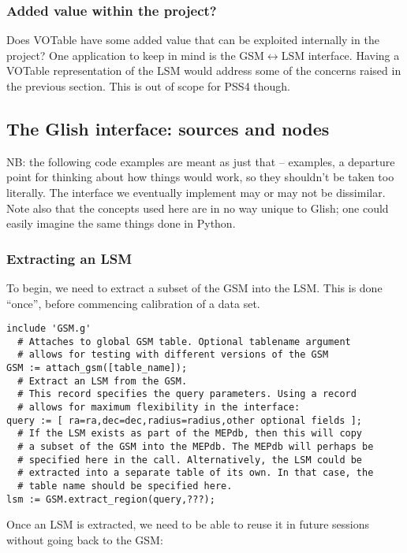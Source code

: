 \documentclass[10pt]{article}
\begin{document}
\subsubsection{Added value within the project?}

Does VOTable have some added value that can be exploited internally in the
project? One application to keep in mind is the GSM$\leftrightarrow$LSM
interface. Having a VOTable representation of the LSM would address some of the
concerns raised in the previous section. This is out of scope for PSS4 though.

\subsection{The Glish interface: sources and nodes}

NB: the following code examples are meant as just that -- examples, a departure
point for thinking about how things would work, so they shouldn't be taken too
literally. The interface we eventually implement may or may not be dissimilar.
Note also that the concepts used here are in no way unique to Glish; one could
easily imagine the same things done in Python. 

\subsubsection{Extracting an LSM}

To begin, we need to extract a subset of the GSM into the LSM. This is done
``once'', before commencing calibration of a data set.

\begin{verbatim}
include 'GSM.g'
  # Attaches to global GSM table. Optional tablename argument 
  # allows for testing with different versions of the GSM
GSM := attach_gsm([table_name]);   
  # Extract an LSM from the GSM.
  # This record specifies the query parameters. Using a record 
  # allows for maximum flexibility in the interface:
query := [ ra=ra,dec=dec,radius=radius,other optional fields ];
  # If the LSM exists as part of the MEPdb, then this will copy 
  # a subset of the GSM into the MEPdb. The MEPdb will perhaps be 
  # specified here in the call. Alternatively, the LSM could be 
  # extracted into a separate table of its own. In that case, the 
  # table name should be specified here.
lsm := GSM.extract_region(query,???);
\end{verbatim}

Once an LSM is extracted, we need to be able to reuse it in future
sessions without going back to the GSM:
\end{document}
